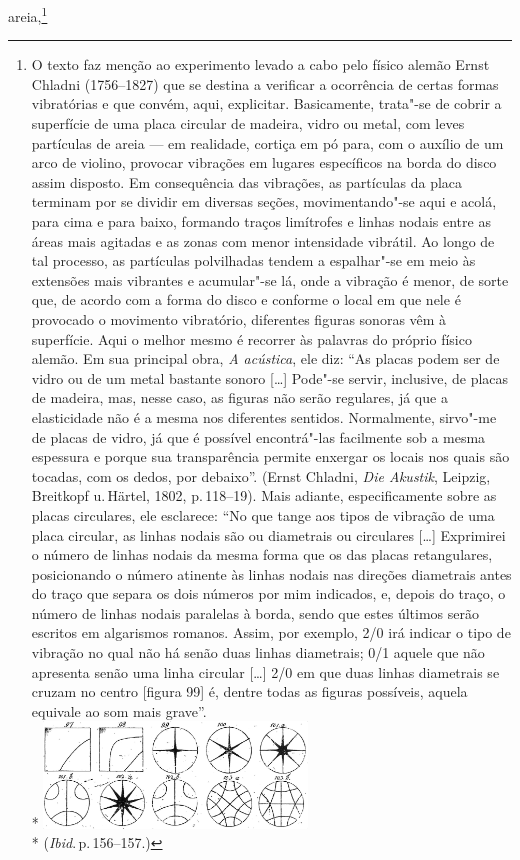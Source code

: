 areia,\footnote{O texto faz menção ao experimento levado a cabo pelo
físico alemão Ernst Chladni (1756--1827) que se destina a
verificar a ocorrência de certas formas vibratórias e que convém, aqui,
explicitar. Basicamente, trata"-se de cobrir a superfície de uma placa
circular de madeira, vidro ou metal, com leves partículas de areia --- em
realidade, cortiça em pó para, com o auxílio de um arco de violino,
provocar vibrações em lugares específicos na borda do disco assim
disposto. Em consequência das vibrações, as partículas da placa
terminam por se dividir em diversas seções, movimentando"-se aqui e
acolá, para cima e para baixo, formando traços limítrofes e linhas
nodais entre as áreas mais agitadas e as zonas com menor intensidade
vibrátil. Ao longo de tal processo, as partículas polvilhadas tendem a
espalhar"-se em meio às extensões mais vibrantes e acumular"-se lá,
onde a vibração é menor, de sorte que, de acordo com a forma do disco e
conforme o local em que nele é provocado o movimento vibratório,
diferentes figuras sonoras vêm à superfície. Aqui o melhor
mesmo é recorrer às palavras do próprio físico alemão. Em sua principal
obra, \textit{A acústica}, ele diz: “As placas podem ser de vidro ou de
um metal bastante sonoro [\ldots{}] Pode"-se servir, inclusive, de placas
de madeira, mas, nesse caso, as figuras não serão regulares, já que a
elasticidade não é a mesma nos diferentes sentidos. Normalmente,
sirvo"-me de placas de vidro, já que é possível encontrá"-las
facilmente sob a mesma espessura e porque sua transparência permite
enxergar os locais nos quais são tocadas, com os dedos, por debaixo”.
(Ernst Chladni, \textit{Die Akustik}, Leipzig,
Breitkopf u.\,Härtel, 1802, p.\,118--19). Mais adiante, especificamente
sobre as placas circulares, ele esclarece: “No que tange aos tipos de
vibração de uma placa circular, as linhas nodais são ou diametrais ou
circulares [\ldots{}] Exprimirei o número de linhas nodais da mesma forma
que os das placas retangulares, posicionando o número atinente às
linhas nodais nas direções diametrais antes do traço que separa os dois
números por mim indicados, e, depois do traço, o número de linhas
nodais paralelas à borda, sendo que estes últimos serão escritos em
algarismos romanos. Assim, por exemplo, 2/0 irá indicar o tipo de
vibração no qual não há senão duas linhas diametrais; 0/1 aquele que
não apresenta senão uma linha circular [\ldots{}] 2/0 em que duas linhas
diametrais se cruzam no centro [figura 99] é, dentre todas as
figuras possíveis, aquela equivale ao som mais grave''.\\*
\mbox{}\hfil\includegraphics[width=7cm]{imagem.png}\hfil\\*
\mbox{}\hfill(\textit{Ibid}.\,p.\,156--157.)}
